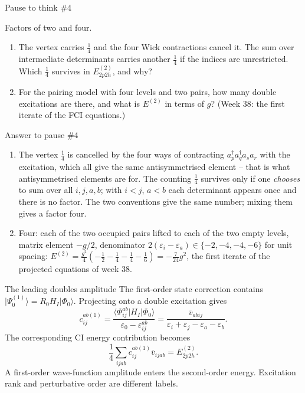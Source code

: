 \documentclass[aspectratio=169,10pt]{beamer}
\newcounter{thinkctr}
\newcommand{\thinkq}[2]{%
  \stepcounter{thinkctr}%
  \vfill
  \begin{tcolorbox}[enhanced,colback=palewarm,colframe=warm,boxrule=1.2pt,arc=4pt,
    grow to left by=6mm,grow to right by=6mm,
    left=16pt,right=16pt,top=16pt,bottom=18pt,
    fonttitle=\bfseries\Large,fontupper=\Large,
    title={Pause to think \#\thethinkctr\hfill\mdseries\normalsize(about #1 min -- discuss with your neighbour)}]
  #2
  \end{tcolorbox}
  \vfill}
\newcommand{\thinka}[1]{%
  \vfill
  \begin{tcolorbox}[enhanced,colback=paleteal,colframe=teal,boxrule=1.2pt,arc=4pt,
    grow to left by=6mm,grow to right by=6mm,
    left=16pt,right=16pt,top=16pt,bottom=18pt,
    fonttitle=\bfseries\Large,fontupper=\large,
    title={Answer to pause \#\thethinkctr}]
  #1
  \end{tcolorbox}
  \vfill}
\newcommand{\ket}[1]{\vert #1\rangle}
\newcommand{\mel}[3]{\langle #1\lvert #2\rvert #3\rangle}
\newcommand{\cre}[1]{a_{#1}^{\dagger}}
\newcommand{\ann}[1]{a_{#1}}
\newcommand{\vbar}[4]{\overline v_{#1#2#3#4}}
\newcommand{\ph}{\Phi_0}
\begin{document}
\begin{frame}{Pause to think \#4}
\thinkq{3}{Factors of two and four.
\begin{enumerate}
\item The vertex carries \(\tfrac14\) and the four Wick contractions cancel it. The sum over intermediate determinants carries another \(\tfrac14\) if the indices are unrestricted. Which \(\tfrac14\) survives in \(E^{(2)}_{2p2h}\), and why?
\item For the pairing model with four levels and two pairs, how many double excitations are there, and what is \(E^{(2)}\) in terms of \(g\)? (Week 38: the first iterate of the FCI equations.)
\end{enumerate}}
\end{frame}

\begin{frame}{Answer to pause \#4}
\thinka{%
\begin{enumerate}
\item The vertex \(\tfrac14\) is cancelled by the four ways of contracting \(\cre{p}\cre{q}\ann{s}\ann{r}\) with the excitation, which all give the same antisymmetrised element -- that is what antisymmetrised elements are for. The counting \(\tfrac14\) survives only if one \emph{chooses} to sum over all \(i,j,a,b\); with \(i<j\), \(a<b\) each determinant appears once and there is no factor. The two conventions give the same number; mixing them gives a factor four.
\item Four: each of the two occupied pairs lifted to each of the two empty levels, matrix element \(-g/2\), denominator \(2(\varepsilon_i-\varepsilon_a)\in\{-2,-4,-4,-6\}\) for unit spacing: \(E^{(2)}=\frac{g^2}{4}\left(-\frac12-\frac14-\frac14-\frac16\right)=-\frac{7}{24}g^2\), the first iterate of the projected equations of week 38.
\end{enumerate}}
\end{frame}

\begin{frame}{The leading doubles amplitude}
The first-order state correction contains
\(\ket{\Psi_0^{(1)}}=R_0H_I\ket{\ph}\).
Projecting onto a double excitation gives
\[
\boxed{c_{ij}^{ab(1)}=
\frac{\mel{\Phi_{ij}^{ab}}{H_I}{\ph}}
 {\varepsilon_0-\varepsilon_{ij}^{ab}}
=\frac{\vbar{a}{b}{i}{j}}
 {\varepsilon_i+\varepsilon_j-\varepsilon_a-\varepsilon_b}.}
\]
The corresponding CI energy contribution becomes
\[
\frac14\sum_{ijab}c_{ij}^{ab(1)}\vbar{i}{j}{a}{b}
=E^{(2)}_{2p2h}.
\]
\small A first-order wave-function amplitude enters the second-order energy. Excitation rank and perturbative order are different labels.
\end{frame}
\end{document}
